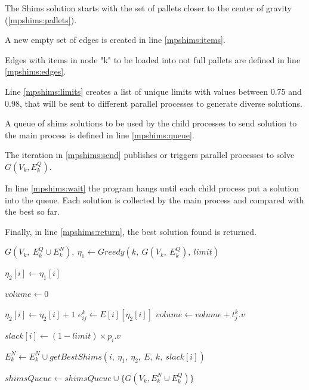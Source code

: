 \documentclass[preprint,authoryear]{elsarticle}
\begin{document}
The Shims solution starts with the set of pallets closer to the center of gravity (\ref{mpshims:pallets}).

A new empty set of edges is created in line \ref{mpshims:items}.

Edges with items in node "k" to be loaded into not full pallets are defined in line \ref{mpshims:edges}.

Line \ref{mpshims:limits} creates a list of unique limits with values between 0.75 and 0.98, that will be sent to different parallel processes to generate diverse solutions.

A queue of shims solutions to be used by the child processes to send solution to the main process is defined in line \ref{mpshims:queue}.

The iteration in \ref{mpshims:send} publishes or triggers parallel processes to solve $G(V_k, E^Q_k)$.

In line \ref{mpshims:wait} the program hangs until each child process put a solution into the queue. Each solution is collected by the main process and compared with the best so far.

Finally, in line \ref{mpshims:return}, the best solution found is returned.


\begin{algorithm}[H]
	\caption{ $shimsSolve(G,\ M,\ shimsQueue,\ limit,\ E)$}  \label{alg:shimsSolve}
	\begin{algorithmic}[1]
		
		\State $G(V_k,\ E^Q_k \cup E^N_k),\ \eta_1 \gets Greedy(k,\ G(V_k,\ E^Q_k),\ limit)$ \label{first_phase}
				
	
			\State $\eta_2[i] \gets \eta_1[i]$	
			
			\State $volume \gets 0$	

			\Repeat \label{second_phase_begin}
				\State $\eta_2[i] \gets \eta_2[i] + 1$ 
				\State $e^k_{ij} \gets E[i][\eta_2[i]]$
				\State $volume \gets volume + t^k_j.v$
			 \label{second_phase_end}
			
			\State $slack[i] \gets (1-limit) \times p_i.v$
			
			\State $E^N_k \gets E^N_k \cup getBestShims(i,\ \eta_1,\ \eta_2,\ E,\ k,\ slack[i])$ \label{third_phase}
		
		\EndFor
		
		\State $shimsQueue \gets shimsQueue \cup \{G(V_k, E^N_k \cup E^Q_k)\}$ \label{enqueue}
		
	\end{algorithmic}
\end{algorithm}
\end{document}
